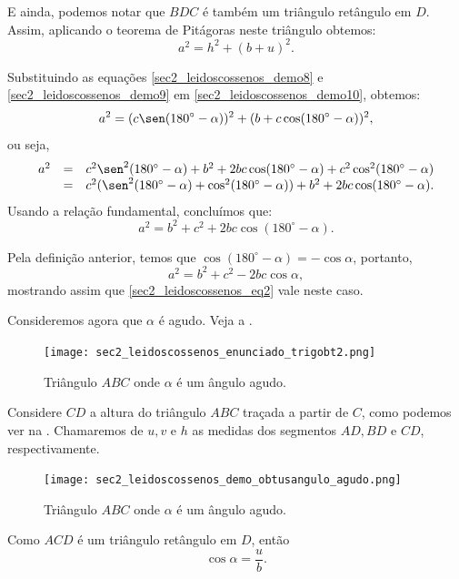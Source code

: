 E ainda, podemos notar que $BDC$ é também um triângulo retângulo em $D$. Assim, aplicando o teorema de Pitágoras neste triângulo obtemos:
\begin{equation}
    a^2=h^2+(b+u)^2. \label{sec2_leidoscossenos_demo10}
\end{equation}

Substituindo as equações \eqref{sec2_leidoscossenos_demo8} e \eqref{sec2_leidoscossenos_demo9} em \eqref{sec2_leidoscossenos_demo10}, obtemos:
$$a^2=(c\sen (180^\circ-\alpha))^2+(b+c\cos (180^\circ-\alpha))^2,$$
ou seja,
$$\begin{array}{ccc}
    a^2 & = &  c^2\sen^2 (180^\circ-\alpha)+b^2+2bc\cos (180^\circ-\alpha)+c^2\cos^2 (180^\circ-\alpha)\\
    & = & c^2(\sen^2 (180^\circ-\alpha)+\cos^2 (180^\circ-\alpha))+b^2+2bc\cos (180^\circ-\alpha).
\end{array}$$
Usando a relação fundamental, concluímos que:
\begin{equation}
    a^2=b^2+c^2+2bc\cos (180^\circ-\alpha).\label{sec2_leidoscossenos_demo11}
\end{equation}

Pela definição anterior, temos que $\cos(180^\circ-\alpha)=-\cos\alpha$, portanto, 
$$a^2=b^2+c^2-2bc\cos\alpha,$$
mostrando assim que \eqref{sec2_leidoscossenos_eq2} vale neste caso.

Consideremos agora que $\alpha$ é agudo. Veja a .

\begin{figure}[H]
    \centering
    \texttt{[image: sec2\_leidoscossenos\_enunciado\_trigobt2.png]}
    \caption{Triângulo $ABC$ onde $\alpha$ é um ângulo agudo.}
    \label{sec2_leidoscossenos_fig_demo_obtusangulo_agudo1}
\end{figure}

Considere $CD$ a altura do triângulo $ABC$ traçada a partir de $C$, como podemos ver na . Chamaremos de $u, v$ e $h$ as medidas dos segmentos $AD, BD$ e $CD$, respectivamente.

\begin{figure}[H]
    \centering
    \texttt{[image: sec2\_leidoscossenos\_demo\_obtusangulo\_agudo.png]}
    \caption{Triângulo $ABC$ onde $\alpha$ é um ângulo agudo.}
    \label{sec2_leidoscossenos_fig_demo_obtusangulo_agudo2}
\end{figure}

Como $ACD$ é um triângulo retângulo em $D$, então 
\begin{equation}
    \cos\alpha=\frac{u}{b}.\label{sec2_leidoscossenos_demo12}
\end{equation}

